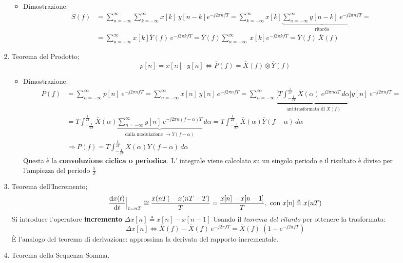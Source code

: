 \documentclass[
]{article}
\providecommand{\tightlist}{%
  \setlength{\itemsep}{0pt}\setlength{\parskip}{0pt}}
\begin{document}
\begin{enumerate}
  \begin{itemize}
  \tightlist
  \item
    Dimostrazione: \begin{align*}
     \overline{S}(f) &= \sum_{n=-\infty}^{\infty} \sum_{k=-\infty}^{\infty} x[k]\ y[n-k] e^{-j2\pi nfT} = \sum_{k=-\infty}^{\infty} x[k] \underbrace{\sum_{n=-\infty}^{\infty}y[n-k]\ e^{-j2\pi nfT}}_{\text{ritardo}}= \\
     &= \sum_{n=-\infty}^{\infty} x[k] \overline{Y}(f) \ e^{-j2\pi kfT} = \overline{Y}(f)  \sum_{n=-\infty}^{\infty} \ x[k]  e^{-j2\pi kfT} =\overline{Y}(f) \ \overline{X}(f)
     \end{align*}
  \end{itemize}
\item
  Teorema del Prodotto; \[
   p[n]=x[n]\cdot y[n] \Longleftrightarrow \overline{P}(f) = \overline{X}(f) \otimes \overline{Y}(f)
   \]

  \begin{itemize}
  \tightlist
  \item
    Dimostrazione: \begin{align*}
     \overline{P}(f)&=\sum_{n=-\infty}^{\infty} p[n] \ e^{-j2\pi nfT} =  \sum_{n=-\infty}^{\infty} x[n] \ y[n] \ e^{-j2\pi nfT} = \sum_{n=-\infty}^{\infty}
     \underbrace{\Big[T\int_{-\frac{1}{2T}}^{\frac{1}{2T}} \overline{X}(\alpha)\ e^{j2\pi n\alpha T} \,d\alpha\Big]}_{\text{antitrasformata di }\overline{X}(f)} y[n] \ e^{-j2\pi nfT} = \\
     &= T \int_{-\frac{1}{2T}}^{\frac{1}{2T}} \overline{X}(\alpha)  \underbrace{\sum_{n=-\infty}^{\infty} y[n] \ e^{-j2\pi n(f-\alpha)T}}_{\text{dalla modulazione }\to \overline{Y}(f-\alpha)} \,d\alpha=
     T \int_{-\frac{1}{2T}}^{\frac{1}{2T}} \overline{X}(\alpha) \overline{Y}(f-\alpha)\,d\alpha  \\
     &\Rightarrow \overline{P}(f) = T \int_{-\frac{1}{2T}}^{\frac{1}{2T}} \overline{X}(\alpha) \overline{Y}(f-\alpha)\,d\alpha
     \end{align*} Questa è la \textbf{convoluzione ciclica o periodica}.
    L' integrale viene calcolato su un singolo periodo e il risultato è
    diviso per l'ampiezza del periodo \(\frac{1}{T}\)
  \end{itemize}
\item
  Teorema dell'Incremento; \[
   \odv{x(t)}{t}\Big|_{t=nT} \cong \frac{x(nT)-x(nT-T)}{T} = \frac{x[n]-x[n-1]}{T}, \text{ con } x[n] \triangleq x(nT)  
   \] Si introduce l'operatore \textbf{incremento}
  \(\Delta x[n] \triangleq x[n] - x[n-1]\) \newline Usando il
  \emph{teorema del ritardo} per ottenere la trasformata: \[
   \Delta x[n] \Longleftrightarrow \overline{X}(f) - \overline{X}(f)\ e^{-j2\pi fT} = \overline{X}(f) \ (1-e^{-j2\pi fT})
   \] È l'analogo del teorema di derivazione: approssima la derivata del
  rapporto incrementale.
\item
  Teorema della Sequenza Somma.


\end{enumerate}
\end{document}
